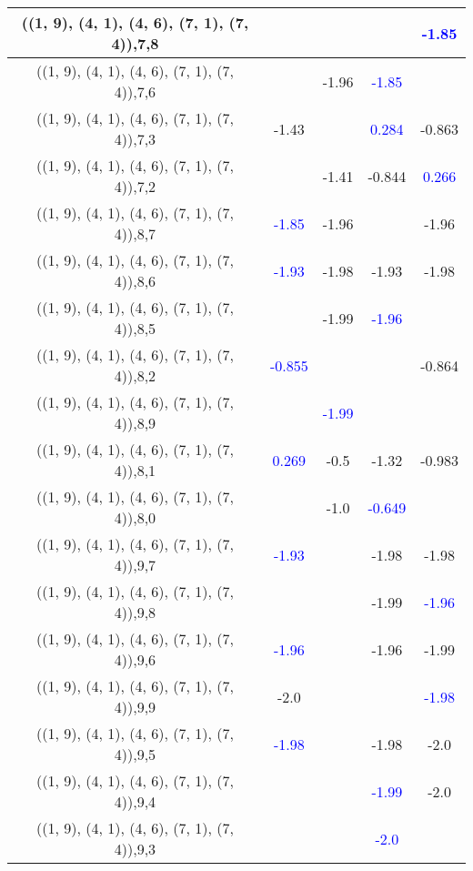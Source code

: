 \documentclass{article}
\begin{document}
\begin{center}
\begin{longtable}{|c|c|c|c|c|}
        	\hline
        	((1, 9), (4, 1), (4, 6), (7, 1), (7, 4)),7,8&&&& \textcolor{blue}{-1.85}\\
        	\hline
        	((1, 9), (4, 1), (4, 6), (7, 1), (7, 4)),7,6&&-1.96& \textcolor{blue}{-1.85}&\\
        	\hline
        	((1, 9), (4, 1), (4, 6), (7, 1), (7, 4)),7,3&-1.43&& \textcolor{blue}{0.284}&-0.863\\
        	\hline
        	((1, 9), (4, 1), (4, 6), (7, 1), (7, 4)),7,2&&-1.41&-0.844& \textcolor{blue}{0.266}\\
        	\hline
        	((1, 9), (4, 1), (4, 6), (7, 1), (7, 4)),8,7& \textcolor{blue}{-1.85}&-1.96&&-1.96\\
        	\hline
        	((1, 9), (4, 1), (4, 6), (7, 1), (7, 4)),8,6& \textcolor{blue}{-1.93}&-1.98&-1.93&-1.98\\
        	\hline
        	((1, 9), (4, 1), (4, 6), (7, 1), (7, 4)),8,5&&-1.99& \textcolor{blue}{-1.96}&\\
        	\hline
        	((1, 9), (4, 1), (4, 6), (7, 1), (7, 4)),8,2& \textcolor{blue}{-0.855}&&&-0.864\\
        	\hline
        	((1, 9), (4, 1), (4, 6), (7, 1), (7, 4)),8,9&& \textcolor{blue}{-1.99}&&\\
        	\hline
        	((1, 9), (4, 1), (4, 6), (7, 1), (7, 4)),8,1& \textcolor{blue}{0.269}&-0.5&-1.32&-0.983\\
        	\hline
        	((1, 9), (4, 1), (4, 6), (7, 1), (7, 4)),8,0&&-1.0& \textcolor{blue}{-0.649}&\\
        	\hline
        	((1, 9), (4, 1), (4, 6), (7, 1), (7, 4)),9,7& \textcolor{blue}{-1.93}&&-1.98&-1.98\\
        	\hline
        	((1, 9), (4, 1), (4, 6), (7, 1), (7, 4)),9,8&&&-1.99& \textcolor{blue}{-1.96}\\
        	\hline
        	((1, 9), (4, 1), (4, 6), (7, 1), (7, 4)),9,6& \textcolor{blue}{-1.96}&&-1.96&-1.99\\
        	\hline
        	((1, 9), (4, 1), (4, 6), (7, 1), (7, 4)),9,9&-2.0&&& \textcolor{blue}{-1.98}\\
        	\hline
        	((1, 9), (4, 1), (4, 6), (7, 1), (7, 4)),9,5& \textcolor{blue}{-1.98}&&-1.98&-2.0\\
        	\hline
        	((1, 9), (4, 1), (4, 6), (7, 1), (7, 4)),9,4&&& \textcolor{blue}{-1.99}&-2.0\\
        	\hline
        	((1, 9), (4, 1), (4, 6), (7, 1), (7, 4)),9,3&&& \textcolor{blue}{-2.0}&\\

\end{longtable}
\end{center}
\end{document}
